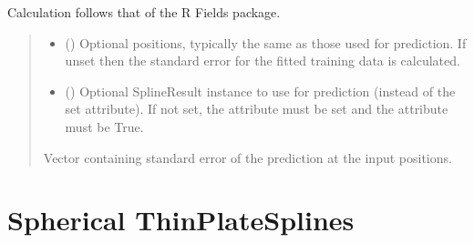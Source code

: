 \documentclass[letterpaper,10pt,english]{sphinxmanual}
\begin{document}
\begin{fulllineitems}
\begin{fulllineitems}
\sphinxAtStartPar
Calculation follows that of the R Fields package. 
\begin{quote}\begin{description}
\begin{itemize}
\item {}
\sphinxAtStartPar
{} () \textendash{} Optional positions, typically the same as those used for prediction.
If unset then the standard error for the fitted training data is
calculated.

\item {}
\sphinxAtStartPar
{} () \textendash{} Optional SplineResult instance to use for prediction (instead of the
set  attribute). If not set, the  attribute must be
set and the  attribute must be True.

\end{itemize}

\sphinxAtStartPar
Vector containing standard error of the prediction at the input
positions.

\sphinxAtStartPar
{}

\end{description}\end{quote}

\end{fulllineitems}


\end{fulllineitems}



\section{Spherical Thin\sphinxhyphen{}Plate\sphinxhyphen{}Splines}
\label{\detokenize{splines:spherical-thin-plate-splines}}
\end{document}
